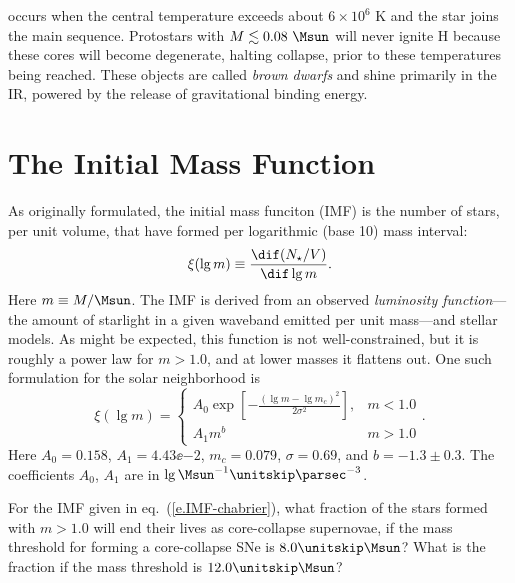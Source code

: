  occurs when the central temperature exceeds about $6\times10^6$ K and the star joins the main sequence.
Protostars with $M\lesssim0.08\ \Msun$ will never ignite H because these cores will become degenerate, halting collapse, prior to these temperatures being reached.
These objects are called {\it brown dwarfs} and shine primarily in the IR, powered by the release of gravitational binding energy.


\section{The Initial Mass Function}
\newcommand{\tms}{\ensuremath{\tau_{\mathrm{MS}}}}
\newcommand{\tauG}{\ensuremath{\tau_{\mathrm{G}}}}
\newcommand{\AIa}{\ensuremath{A_{\mathrm{Ia}}}}

As originally formulated\cite{Salpeter1955The-Luminosity-}, the initial mass funciton (IMF) is the number of stars, per unit volume, that have formed per logarithmic (base 10) mass interval:
\begin{equation}\label{e.IMF}
\xi(\lg m) \equiv \frac{\dif(N_{\star}/V)}{\dif\lg m}.
\end{equation}
Here $m \equiv M/\Msun$.
The IMF is derived from an observed \emph{luminosity function}---the amount of starlight in a given waveband emitted per unit mass---and stellar models.  As might be expected, this function is not well-constrained, but it is roughly a power law for $m > 1.0$, and at lower masses it flattens out. One such formulation\cite{Chabrier2003Galactic-Stella} for the solar neighborhood is
\begin{equation}\label{e.IMF-chabrier}
\xi(\lg m) = \left\{\begin{array}{lr}A_0\exp\left[-\frac{(\lg m - \lg m_c)^2}{2\sigma^2}\right], & m < 1.0 \\A_1 m^b & m > 1.0\end{array}\right. .
\end{equation}
Here $A_{0} = 0.158$, $A_{1} = 4.43\ee{-2}$, $m_{c} = 0.079$, $\sigma = 0.69$, and $b = -1.3\pm 0.3$.  The coefficients $A_{0}$, $A_{1}$ are in $\lg\Msun^{-1}\usp\parsec^{-3}$.

\begin{exercisebox}
 For the IMF given in eq.~(\ref{e.IMF-chabrier}), what fraction of the stars formed with $m > 1.0$ will end their lives as core-collapse supernovae, if the mass threshold for forming a core-collapse SNe is $8.0\nsp\Msun$?  What is the fraction if the mass threshold is $12.0\nsp\Msun$?
\end{exercisebox}


